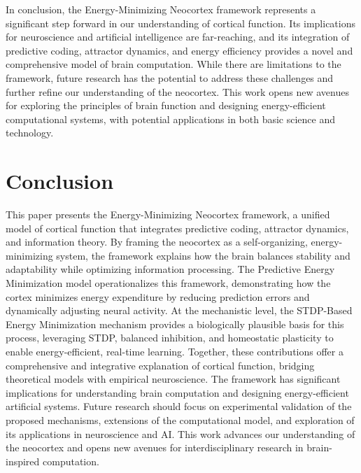 \documentclass{article}
\begin{document}
In conclusion, the Energy-Minimizing Neocortex framework represents a significant step forward in our understanding of cortical function. Its implications for neuroscience and artificial intelligence are far-reaching, and its integration of predictive coding, attractor dynamics, and energy efficiency provides a novel and comprehensive model of brain computation. While there are limitations to the framework, future research has the potential to address these challenges and further refine our understanding of the neocortex. This work opens new avenues for exploring the principles of brain function and designing energy-efficient computational systems, with potential applications in both basic science and technology.

\section{Conclusion}
This paper presents the Energy-Minimizing Neocortex framework, a unified model of cortical function that integrates predictive coding, attractor dynamics, and information theory. By framing the neocortex as a self-organizing, energy-minimizing system, the framework explains how the brain balances stability and adaptability while optimizing information processing. The Predictive Energy Minimization model operationalizes this framework, demonstrating how the cortex minimizes energy expenditure by reducing prediction errors and dynamically adjusting neural activity. At the mechanistic level, the STDP-Based Energy Minimization mechanism provides a biologically plausible basis for this process, leveraging STDP, balanced inhibition, and homeostatic plasticity to enable energy-efficient, real-time learning. Together, these contributions offer a comprehensive and integrative explanation of cortical function, bridging theoretical models with empirical neuroscience. The framework has significant implications for understanding brain computation and designing energy-efficient artificial systems. Future research should focus on experimental validation of the proposed mechanisms, extensions of the computational model, and exploration of its applications in neuroscience and AI. This work advances our understanding of the neocortex and opens new avenues for interdisciplinary research in brain-inspired computation.
\end{document}
